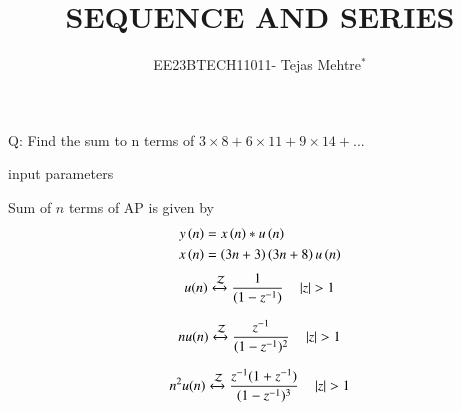 \documentclass[journal,12pt,onecolumn]{IEEEtran}
\theoremstyle{remark}
\begin{document}
\let\vec\mathbf



\title{SEQUENCE AND SERIES}
\author{EE23BTECH11011- Tejas Mehtre$^{*}$%
}
\maketitle




\bigskip

\renewcommand{\thefigure}{\theenumi}
\renewcommand{\thetable}{\theenumi}
Q: Find the sum to n terms of $3 \times 8 + 6 \times 11 + 9 \times 14 + ...$ \\
    \solution
    \begin{table}[!ht]
    \centering
        
    \caption{input parameters}
    \label{}
\end{table}
    
       
        Sum of $n$ terms of AP is given by
        \begin{align}
            y\left(n\right) &= x\left(n\right)*u\left(n\right)\\
            x\left(n\right) &= \left(3n+3\right)\left(3n+8\right)u\left(n\right)
        \end{align}
        \begin{equation}
   u(n) \xleftrightarrow{\mathcal{Z}} \frac{1}{(1-z^{-1})}  \quad \left\vert z\right\vert>1\\ \label{eq:11.9.4.10.1.eq}
\end{equation}

\begin{equation}   
   nu(n) \xleftrightarrow{\mathcal{Z}} \frac{z^{-1}}{(1-z^{-1})^2} \quad \left\vert z\right\vert>1\\ \label{eq:11.9.4.10.2.eq}
\end{equation}

\begin{equation}   
   n^2u(n) \xleftrightarrow{\mathcal{Z}} \frac{z^{-1}(1+z^{-1})}{(1-z^{-1})^3} \quad \left\vert z\right\vert>1 \\ \label{eq:11.9.4.10.3.eq}
\end{equation}  
\end{document}
